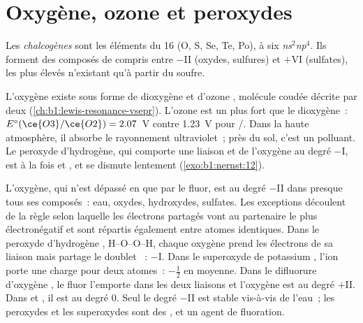 \section{Oxygène, ozone et peroxydes}

\begin{definition}[Chalcogènes]\label{def:b1:p-block-16-18:chalcogen}
Les \emph{chalcogènes} sont les éléments du
 16
(O, S, Se, Te, Po), à six  \textit{ns}$^2$\textit{np}$^4$.
Ils forment des composés de  compris entre $-$II
(oxydes, sulfures) et $+$VI (sulfates), les plus élevés n'existant qu'à
partir du soufre.
\end{definition}

L'oxygène existe sous forme de dioxygène  et d'ozone ,
molécule coudée décrite par deux 
(\cref{ch:b1:lewis-resonance-vsepr}). L'ozone est un  plus fort
que le dioxygène~: $E^\circ(\ce{O3}/\ce{O2}) = 2.07$~V
contre 1.23~V pour /. Dans la haute atmosphère, il
absorbe le rayonnement ultraviolet~; près du sol, c'est un polluant. Le
peroxyde d'hydrogène, qui comporte une liaison  et de l'oxygène
au degré $-$I, est à la fois  et , et se dismute
lentement (\cref{exo:b1:nernst:12}).

\begin{example}
L'oxygène, qui n'est dépassé en  que par le fluor, est
au degré $-$II dans presque tous ses composés~: eau, oxydes, hydroxydes,
sulfates. Les exceptions découlent de la règle selon laquelle les
électrons partagés vont au partenaire le plus électronégatif et sont
répartis également entre atomes identiques. Dans le peroxyde
d'hydrogène , H--O--O--H, chaque oxygène prend les électrons de
sa liaison  mais partage le doublet ~: $-$I. Dans le
superoxyde de potassium , l'ion  porte une charge pour
deux atomes~: $-\frac12$ en moyenne. Dans le difluorure d'oxygène
, le fluor l'emporte dans les deux liaisons et l'oxygène est au
degré $+$II. Dans  et , il est au degré 0. Seul le degré
$-$II est stable vis-à-vis de l'eau~; les peroxydes et les superoxydes
sont des , et  un agent de fluoration.
\end{example}

